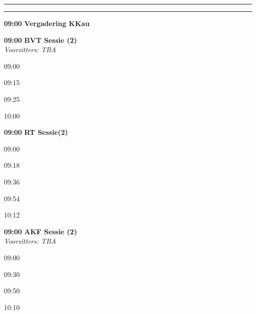 \documentclass[a4paper,10pt]{report}
\begin{document}
\begin{multicols*}{3}


\hrule\vspace{2mm}
\vspace{2mm}\hrule\strut


\begin{packed_enum}
\item[\textbf{09:00}] \textbf{Vergadering KKau}
\end{packed_enum} %

\vfill

\begin{packed_enum}
\item[\textbf{09:00}] \textbf{BVT Sessie (2)}\\\textit{Voorzitters: TBA}
\item[09:00] 
\item[09:15]  
\item[09:25] 
\item[10:00] 
\end{packed_enum} %

\vfill

\begin{packed_enum}
\item[\textbf{09:00}]{\textbf{RT Sessie(2)}}
\item[09:00] 
\item[09:18] 
\item[09:36] 
\item[09:54] 
\item[10:12] 
\end{packed_enum} %

\vfill

\begin{packed_enum}
\item[\textbf{09:00}] \textbf{AKF Sessie (2)}\\\textit{Voorzitters: TBA}
\item[09:00] 
\item[09:30] 
\item[09:50] 
\item[10:10] 
\end{packed_enum} %


\end{multicols*}
\end{document}
